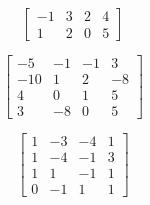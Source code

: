 \begin{puzzle}
    \[
        \begin{bmatrix}
            -1 & 3 & 2 & 4 \\
            1  & 2 & 0 & 5
        \end{bmatrix}
    \]
\end{puzzle}

\begin{puzzle}
    \[
        \begin{bmatrix}
            -5  & -1 & -1 & 3  \\
            -10 & 1  & 2  & -8 \\
            4   & 0  & 1  & 5  \\
            3   & -8 & 0  & 5
        \end{bmatrix}
    \]
\end{puzzle}

\begin{puzzle}
    \[
        \begin{bmatrix}
            1 & -3 & -4 & 1 \\
            1 & -4 & -1 & 3 \\
            1 & 1  & -1 & 1 \\
            0 & -1 & 1  & 1
        \end{bmatrix}
    \]
\end{puzzle}
